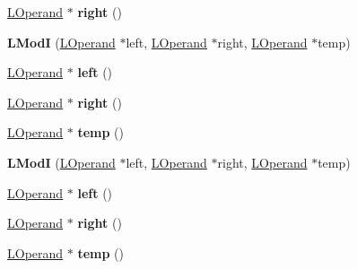 \begin{DoxyCompactItemize}
\item 
\hyperlink{classv8_1_1internal_1_1_l_operand}{L\+Operand} $\ast$ {\bfseries right} ()\hypertarget{classv8_1_1internal_1_1_l_mod_i_a1cf38930a4ba82683054b45ea0790c91}{}\label{classv8_1_1internal_1_1_l_mod_i_a1cf38930a4ba82683054b45ea0790c91}

\item 
{\bfseries L\+ModI} (\hyperlink{classv8_1_1internal_1_1_l_operand}{L\+Operand} $\ast$left, \hyperlink{classv8_1_1internal_1_1_l_operand}{L\+Operand} $\ast$right, \hyperlink{classv8_1_1internal_1_1_l_operand}{L\+Operand} $\ast$temp)\hypertarget{classv8_1_1internal_1_1_l_mod_i_aae2aab848991edee64cb399cbcd8c9be}{}\label{classv8_1_1internal_1_1_l_mod_i_aae2aab848991edee64cb399cbcd8c9be}

\item 
\hyperlink{classv8_1_1internal_1_1_l_operand}{L\+Operand} $\ast$ {\bfseries left} ()\hypertarget{classv8_1_1internal_1_1_l_mod_i_a4b97251c08cb973560861f2c7cbe18ea}{}\label{classv8_1_1internal_1_1_l_mod_i_a4b97251c08cb973560861f2c7cbe18ea}

\item 
\hyperlink{classv8_1_1internal_1_1_l_operand}{L\+Operand} $\ast$ {\bfseries right} ()\hypertarget{classv8_1_1internal_1_1_l_mod_i_a1cf38930a4ba82683054b45ea0790c91}{}\label{classv8_1_1internal_1_1_l_mod_i_a1cf38930a4ba82683054b45ea0790c91}

\item 
\hyperlink{classv8_1_1internal_1_1_l_operand}{L\+Operand} $\ast$ {\bfseries temp} ()\hypertarget{classv8_1_1internal_1_1_l_mod_i_a61433c24a5b1830ed8577adedbc066b5}{}\label{classv8_1_1internal_1_1_l_mod_i_a61433c24a5b1830ed8577adedbc066b5}

\item 
{\bfseries L\+ModI} (\hyperlink{classv8_1_1internal_1_1_l_operand}{L\+Operand} $\ast$left, \hyperlink{classv8_1_1internal_1_1_l_operand}{L\+Operand} $\ast$right, \hyperlink{classv8_1_1internal_1_1_l_operand}{L\+Operand} $\ast$temp)\hypertarget{classv8_1_1internal_1_1_l_mod_i_aae2aab848991edee64cb399cbcd8c9be}{}\label{classv8_1_1internal_1_1_l_mod_i_aae2aab848991edee64cb399cbcd8c9be}

\item 
\hyperlink{classv8_1_1internal_1_1_l_operand}{L\+Operand} $\ast$ {\bfseries left} ()\hypertarget{classv8_1_1internal_1_1_l_mod_i_a4b97251c08cb973560861f2c7cbe18ea}{}\label{classv8_1_1internal_1_1_l_mod_i_a4b97251c08cb973560861f2c7cbe18ea}

\item 
\hyperlink{classv8_1_1internal_1_1_l_operand}{L\+Operand} $\ast$ {\bfseries right} ()\hypertarget{classv8_1_1internal_1_1_l_mod_i_a1cf38930a4ba82683054b45ea0790c91}{}\label{classv8_1_1internal_1_1_l_mod_i_a1cf38930a4ba82683054b45ea0790c91}

\item 
\hyperlink{classv8_1_1internal_1_1_l_operand}{L\+Operand} $\ast$ {\bfseries temp} ()\hypertarget{classv8_1_1internal_1_1_l_mod_i_a61433c24a5b1830ed8577adedbc066b5}{}\label{classv8_1_1internal_1_1_l_mod_i_a61433c24a5b1830ed8577adedbc066b5}

\end{DoxyCompactItemize}
